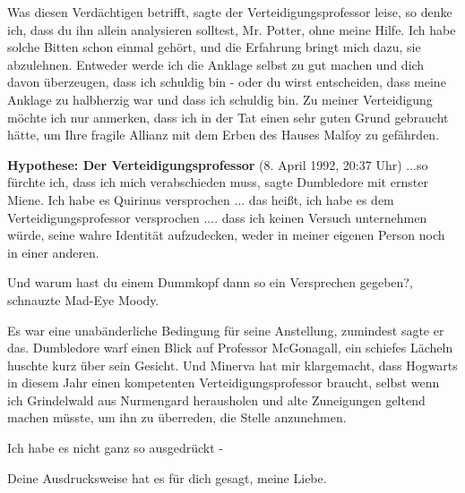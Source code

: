 \glqq{}Was diesen Verdächtigen betrifft\grqq{}, sagte der Verteidigungsprofessor
leise, \glqq{}so denke ich, dass du ihn allein analysieren solltest, Mr. Potter,
ohne meine Hilfe. Ich habe solche Bitten schon einmal gehört, und die Erfahrung
bringt mich dazu, sie abzulehnen. Entweder werde ich die Anklage selbst zu gut
machen und dich davon überzeugen, dass ich schuldig bin - oder du wirst
entscheiden, dass meine Anklage zu halbherzig war und dass ich schuldig bin. Zu
meiner Verteidigung möchte ich nur anmerken, dass ich in der Tat einen sehr
guten Grund gebraucht hätte, um Ihre fragile Allianz mit dem Erben des Hauses
Malfoy zu gefährden.\grqq{}

\textbf{Hypothese: Der Verteidigungsprofessor} (8. April 1992, 20:37 Uhr) \glqq{}
...so fürchte ich, dass ich mich verabschieden muss\grqq{}, sagte Dumbledore mit
ernster Miene. \glqq{}Ich habe es Quirinus versprochen ... das heißt, ich habe es
dem Verteidigungsprofessor versprochen .... dass ich keinen Versuch unternehmen
würde, seine wahre Identität aufzudecken, weder in meiner eigenen Person noch in
einer anderen.\grqq{}

\glqq{}Und warum hast du einem Dummkopf dann so ein Versprechen gegeben?\grqq{},
schnauzte Mad-Eye Moody.

\glqq{}Es war eine unabänderliche Bedingung für seine Anstellung, zumindest sagte
er das.\grqq{} Dumbledore warf einen Blick auf Professor McGonagall, ein
schiefes Lächeln huschte kurz über sein Gesicht. \glqq{}Und Minerva hat mir
klargemacht, dass Hogwarts in diesem Jahr einen kompetenten
Verteidigungsprofessor braucht, selbst wenn ich Grindelwald aus Nurmengard
herausholen und alte Zuneigungen geltend machen müsste, um ihn zu überreden, die
Stelle anzunehmen.\grqq{}

\glqq{}Ich habe es nicht ganz so ausgedrückt -\grqq{}

\glqq{}Deine Ausdrucksweise hat es für dich gesagt, meine Liebe.\grqq{}


